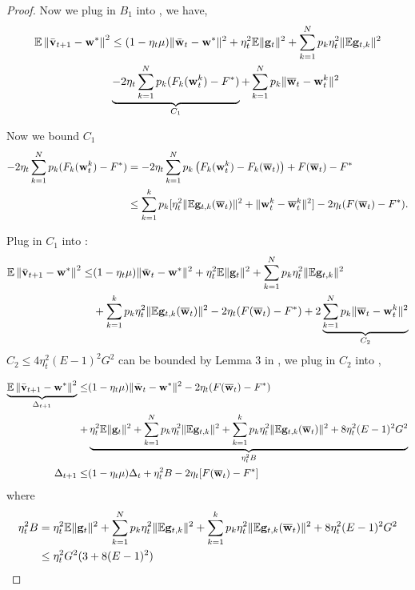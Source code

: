 \begin{proof}
Now we plug in $B_1$ into \eq{\ref{eq:expand2}}, we have,
\begin{align}
	\mathbb{E}\left\|\bar{{\mathbf{v}}}_{t+1}-{\mathbf{w}}^{*}\right\|^2 & \leq (1 - \eta_t\mu)\|\bar{{\mathbf{w}}}_{t}-{\mathbf{w}}^{*}\|^{2} + \eta_{t}^{2} \mathbb{E}\| {\mathbf{g}}_{t} \|^{2} +  \sum_{k=1}^N p_k \eta_t^2 \|\mathbb{E} {\mathbf{g}}_{t,k}\|^2 \\
	& \underbrace{-2\eta_t\sum_{k=1}^N p_k (F_k({\mathbf{w}}_t^k) - F^*)}_{C_1} + \sum_{k=1}^N p_k \|\overline{{\mathbf{w}}}_t - {\mathbf{w}}_t^k\|^2 \label{eq:scvxnsmth2}
\end{align}

Now we bound $C_1$
\begin{align}
	-2\eta_t\sum_{k=1}^N p_k (F_k({\mathbf{w}}_t^k) - F^*) & = -2\eta_t\sum_{k=1}^N p_k \left(F_k({\mathbf{w}}_t^k) - F_k({\overline{\mathbf{w}}}_t)\right) + F({\overline{\mathbf{w}}}_t) -  F^*\\
& \leq \sum_{k=1}^{k} p_{k}[\eta_{t}^{2}\|\mathbb{E} {\mathbf{g}}_{t,k}({\overline{\mathbf{w}}}_{t})\|^{2}+\| {\mathbf{w}}_{t}^{k}-{\overline{\mathbf{w}}}_t^{k} \|^{2}]-2 \eta_{t}(F({\overline{\mathbf{w}}}_{t})- F^{*}). 
\end{align}

Plug in $C_1$ into \eq{\ref{eq:scvxnsmth2}}:
\begin{align}
	\mathbb{E}\left\|\bar{{\mathbf{v}}}_{t+1}-{\mathbf{w}}^{*}\right\|^2 \leq
	&  (1 - \eta_t\mu)\|\bar{{\mathbf{w}}}_{t}-{\mathbf{w}}^{*}\|^{2} + \eta_{t}^{2} \mathbb{E}\| {\mathbf{g}}_{t} \|^{2} +  \sum_{k=1}^N p_k \eta_t^2 \|\mathbb{E} {\mathbf{g}}_{t,k}\|^2 \\& + \sum_{k=1}^{k} p_{k}\eta_{t}^{2}\|\mathbb{E} {\mathbf{g}}_{t,k}({\overline{\mathbf{w}}}_{t})\|^{2}-2 \eta_{t}(F({\overline{\mathbf{w}}}_{t})- F^{*})  + 2 \underbrace{\sum_{k=1}^N p_k \|\overline{{\mathbf{w}}}_t - {\mathbf{w}}_t^k\|^2}_{C_2} \label{eq:scvxnsmth3}
\end{align}
$C_2 \leq  4\eta_t^2 (E-1)^2 G^2$ can be bounded by Lemma 3 in \cite{li2019convergence}, we plug in $C_2$ into \eq{\ref{eq:scvxnsmth3}},


\begin{align}
	\underbrace{\mathbb{E}\left\|\bar{{\mathbf{v}}}_{t+1}-{\mathbf{w}}^{*}\right\|^2}_{\Delta_{t+1}} \leq &  (1 - \eta_t\mu)\|\bar{{\mathbf{w}}}_{t}-{\mathbf{w}}^{*}\|^{2} -2 \eta_{t}(F({\overline{\mathbf{w}}}_{t})- F^{*})\\
	+ & \underbrace{\eta_{t}^{2} \mathbb{E}\| {\mathbf{g}}_{t} \|^{2} +  \sum_{k=1}^N p_k \eta_t^2 \|\mathbb{E} {\mathbf{g}}_{t,k}\|^2  + \sum_{k=1}^{k} p_{k}\eta_{t}^{2}\|\mathbb{E} {\mathbf{g}}_{t,k}({\overline{\mathbf{w}}}_{t})\|^{2} + 8\eta_t^2 (E-1)^2 G^2}_{\eta_t^2 B} \label{eq:scvxnsmth4} \\
	\Delta_{t+1}  \leq &  (1 - \eta_t\mu) \Delta_t + \eta^2_t B - 2 \eta_t [F({\overline{\mathbf{w}}}_{t})- F^{*}] \label{eq:scvxnsmth5}
\end{align}
where 
\begin{align*}
\eta_t^2 B &= \eta_{t}^{2} \mathbb{E}\| {\mathbf{g}}_{t} \|^{2} +  \sum_{k=1}^N p_k \eta_t^2 \|\mathbb{E} {\mathbf{g}}_{t,k}\|^2  + \sum_{k=1}^{k} p_{k}\eta_{t}^{2}\|\mathbb{E} {\mathbf{g}}_{t,k}({\overline{\mathbf{w}}}_{t})\|^{2} + 8\eta_t^2 (E-1)^2 G^2 \\
& \leq \eta_t^2 G^2 (3  + 8 (E-1)^2) 	
\end{align*}


\end{proof}
